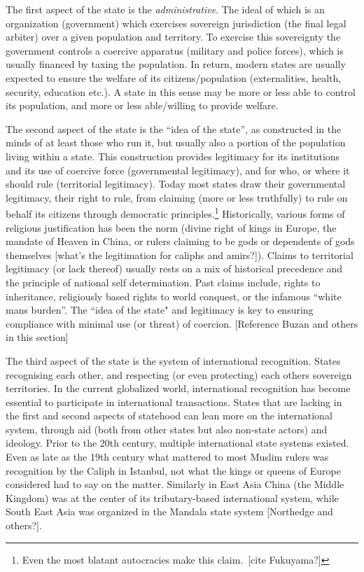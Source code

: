 \documentclass[12pt]{article}
\begin{document}
The first aspect of the state is the \textit{administrative}. The ideal of
which is an organization (government) which exercises sovereign jurisdiction
(the final legal arbiter) over a given population and territory. To exercise
this sovereignty the government controls a coercive apparatus (military and
police forces), which is usually financed by taxing the population. In return,
modern states are usually expected to ensure the welfare of its
citizens/population (externalities, health, security, education etc.). A state
in this sense may be more or less able to control its population, and more or
less able/willing to provide welfare.

The second aspect of the state is the ``idea of the state'', as constructed in
the minds of at least those who run it, but usually also a portion of the
population living within a state. This construction provides legitimacy for its
institutions and its use of coercive force (governmental legitimacy), and for
who, or where it should rule (territorial legitimacy). Today most states draw
their governmental legitimacy, their right to rule, from claiming (more or less
truthfully) to rule on behalf its citizens through democratic
principles.\footnote{Even the most blatant autocracies make this claim. [cite
Fukuyama?]} Historically, various forms of religious justification has been the
norm (divine right of kings in Europe, the mandate of Heaven in China, or rulers
claiming to be gods or dependents of gods themselves [what's the legitimation
for caliphs and amirs?]). Claims to territorial legitimacy (or lack thereof)
usually rests on a mix of historical precedence and the principle of national
self determination. Past claims include, rights to inheritance, religiously
based rights to world conquest, or the infamous ``white mans burden''. The
``idea of the state" and legitimacy is key to ensuring compliance with minimal
use (or threat) of coercion. [Reference Buzan and others in this section]

The third aspect of the state is the system of international recognition. States
recognising each other, and respecting (or even protecting) each others
sovereign territories. In the current globalized world, international
recognition has become essential to participate in international transactions.
States that are lacking in the first and second aspects of statehood can lean
more on the international system, through aid (both from other states but also
non-state actors) and ideology. Prior to the 20th century, multiple
international state systems existed. Even as late as the 19th century what
mattered to most Muslim rulers was recognition by the Caliph in Istanbul, not
what the kings or queens of Europe considered had to say on the matter.
Similarly in East Asia China (the Middle Kingdom) was at the center of its
tributary-based international system, while South East Asia was organized in the
Mandala state system [Northedge and others?].
\end{document}

